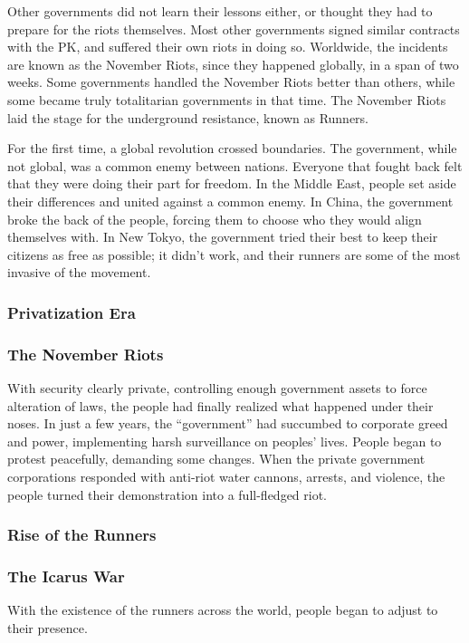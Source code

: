 \documentclass{article}
\begin{document}
\begin{multicols}{2}
Other governments did not learn their lessons either, or thought they had to
prepare for the riots themselves. Most other governments signed similar
contracts with the PK, and suffered their own riots in doing so. Worldwide, the
incidents are known as the November Riots, since they happened globally, in a
span of two weeks. Some governments handled the November Riots better than
others, while some became truly totalitarian governments in that time. The
November Riots laid the stage for the underground resistance, known as Runners.

For the first time, a global revolution crossed boundaries. The government,
while not global, was a common enemy between nations. Everyone that fought back
felt that they were doing their part for freedom. In the Middle East, people
set aside their differences and united against a common enemy. In China, the
government broke the back of the people, forcing them to choose who they would
align themselves with. In New Tokyo, the government tried their best to keep
their citizens as free as possible; it didn’t work, and their runners are some
of the most invasive of the movement.

\subsubsection{Privatization Era}
\subsubsection{The November Riots}
With security clearly private, controlling enough government assets to force
alteration of laws, the people had finally realized what happened under their
noses. In just a few years, the “government” had succumbed to corporate greed
and power, implementing harsh surveillance on peoples’ lives. People began to
protest peacefully, demanding some changes. When the private government
corporations responded with anti-riot water cannons, arrests, and violence, the
people turned their demonstration into a full-fledged riot.
\subsubsection{Rise of the Runners}
\subsubsection{The Icarus War}
With the existence of the runners across the world, people began to adjust to
their presence.


\end{multicols}
\end{document}
